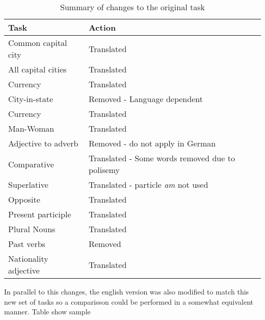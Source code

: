  \begin{table}[h]
   \centering
   \caption{Summary of changes to the original task } 
   \label{tab:summary_of_changes_task}
   \small
   \begin{tabular}{ |l|l|  }

   \hline           
   Task  & Action   \\  \hline           
   Common capital city & Translated \\
   All capital cities  & Translated \\
   Currency & Translated  \\ 
   City-in-state   &  Removed - Language dependent \\
   Currency & Translated  \\
   Man-Woman  & Translated  \\
   Adjective to adverb  &  Removed - do not apply in German \\
   Comparative & Translated - Some words removed due to polisemy \\ 
   Superlative & Translated - particle \textit{am} not used \\
   Opposite  & Translated \\
   Present participle & Translated \\
   Plural Nouns  & Translated \\
   Past verbs &  Removed \\

   Nationality adjective & Translated \\
   
\hline

  
\end{tabular}
\end{table}
    
In parallel to this changes, the english version was also modified to match
this new set of tasks so a comparisson could be performed in a somewhat
equivalent manner.  Table show sample 


